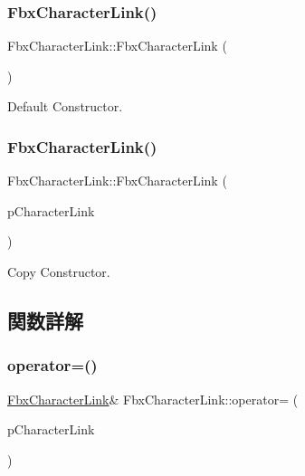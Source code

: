 \subsubsection{\texorpdfstring{Fbx\+Character\+Link()}{FbxCharacterLink()}\hspace{0.1cm}{\footnotesize\ttfamily [1/2]}}
{\footnotesize\ttfamily Fbx\+Character\+Link\+::\+Fbx\+Character\+Link (\begin{DoxyParamCaption}{ }\end{DoxyParamCaption})}

Default Constructor. \mbox{\label{class_fbx_character_link_a8f9d5ca289fe6fc60e6d3648112f8dcc}} 
\subsubsection{\texorpdfstring{Fbx\+Character\+Link()}{FbxCharacterLink()}\hspace{0.1cm}{\footnotesize\ttfamily [2/2]}}
{\footnotesize\ttfamily Fbx\+Character\+Link\+::\+Fbx\+Character\+Link (\begin{DoxyParamCaption}\item[{const \hyperlink{class_fbx_character_link}{Fbx\+Character\+Link} \&}]{p\+Character\+Link }\end{DoxyParamCaption})}

Copy Constructor. 

\subsection{関数詳解}
\mbox{\label{class_fbx_character_link_ace29a4d8c4a64bd6325513e6348c2504}} 
\subsubsection{\texorpdfstring{operator=()}{operator=()}}
{\footnotesize\ttfamily \hyperlink{class_fbx_character_link}{Fbx\+Character\+Link}\& Fbx\+Character\+Link\+::operator= (\begin{DoxyParamCaption}\item[{const \hyperlink{class_fbx_character_link}{Fbx\+Character\+Link} \&}]{p\+Character\+Link }\end{DoxyParamCaption})}

